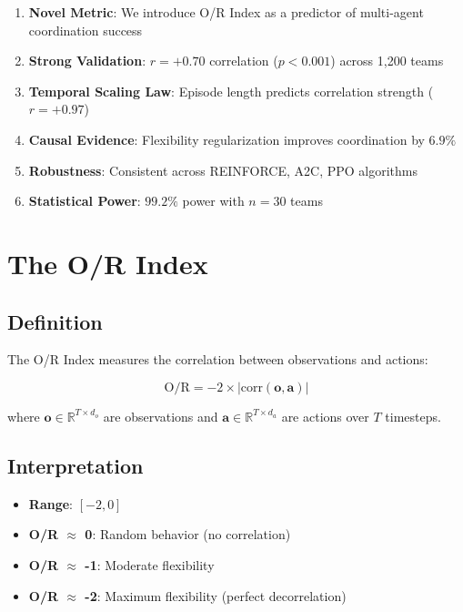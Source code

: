 \documentclass[twoside]{article}
\newcommand{\ORIndex}{O/R Index}
\begin{document}
\begin{enumerate}
    \item \textbf{Novel Metric}: We introduce \ORIndex{} as a predictor of multi-agent coordination success
    \item \textbf{Strong Validation}: $r = +0.70$ correlation ($p < 0.001$) across 1,200 teams
    \item \textbf{Temporal Scaling Law}: Episode length predicts correlation strength ($r = +0.97$)
    \item \textbf{Causal Evidence}: Flexibility regularization improves coordination by $6.9\%$
    \item \textbf{Robustness}: Consistent across REINFORCE, A2C, PPO algorithms
    \item \textbf{Statistical Power}: $99.2\%$ power with $n = 30$ teams
\end{enumerate}

\section{The O/R Index}

\subsection{Definition}

The \ORIndex{} measures the correlation between observations and actions:

\begin{equation}
\text{O/R} = -2 \times \left| \text{corr}(\mathbf{o}, \mathbf{a}) \right|
\end{equation}

where $\mathbf{o} \in \mathbb{R}^{T \times d_o}$ are observations and $\mathbf{a} \in \mathbb{R}^{T \times d_a}$ are actions over $T$ timesteps.

\subsection{Interpretation}

\begin{itemize}
    \item \textbf{Range}: $[-2, 0]$
    \item \textbf{O/R $\approx$ 0}: Random behavior (no correlation)
    \item \textbf{O/R $\approx$ -1}: Moderate flexibility
    \item \textbf{O/R $\approx$ -2}: Maximum flexibility (perfect decorrelation)
\end{itemize}
\end{document}
